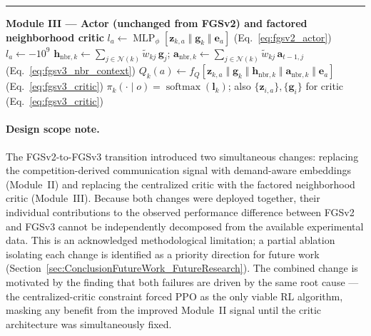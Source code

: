 \begin{algorithm}[ht]
\begin{algorithmic}[1]
    \EndFor
    \Statex \rule{\linewidth}{0.3pt}
    \Statex \textbf{Module III — Actor (unchanged from FGSv2) and factored neighborhood critic}
    \State $l_a \leftarrow \operatorname{MLP}_\phi[\mathbf{z}_{k,a}\;\Vert\;\mathbf{g}_k\;\Vert\;\mathbf{e}_a]$
    \hfill (Eq.~\ref{eq:fgsv2_actor})
    \Else
    \State $l_a \leftarrow -10^9$
    \EndIf
    \EndFor
    \State $\mathbf{h}_{\mathrm{nbr},k} \leftarrow \sum_{j \in \mathcal{N}(k)} \tilde{w}_{kj}\,\mathbf{g}_j$;
    \quad $\mathbf{a}_{\mathrm{nbr},k} \leftarrow \sum_{j \in \mathcal{N}(k)} \tilde{w}_{kj}\,\mathbf{a}_{t-1,j}$
    \hfill (Eq.~\ref{eq:fgsv3_nbr_context})
    \State $Q_k(a) \leftarrow f_Q[\mathbf{z}_{k,a}\;\Vert\;\mathbf{g}_k\;\Vert\;\mathbf{h}_{\mathrm{nbr},k}\;\Vert\;\mathbf{a}_{\mathrm{nbr},k}\;\Vert\;\mathbf{e}_a]$
    \hfill (Eq.~\ref{eq:fgsv3_critic})
    \EndFor
    \State \Return $\pi_k(\cdot\mid o) = \operatorname{softmax}(\mathbf{l}_k)$; also $\{\mathbf{z}_{i,a}\},\{\mathbf{g}_i\}$ for critic (Eq.~\ref{eq:fgsv3_critic})
  \end{algorithmic}
\end{algorithm}

\paragraph{Design scope note.}
The FGSv2-to-FGSv3 transition introduced two simultaneous changes: replacing the competition-derived communication signal with demand-aware embeddings (Module~II) and replacing the centralized critic with the factored neighborhood critic (Module~III). Because both changes were deployed together, their individual contributions to the observed performance difference between FGSv2 and FGSv3 cannot be independently decomposed from the available experimental data. This is an acknowledged methodological limitation; a partial ablation isolating each change is identified as a priority direction for future work (Section~\ref{sec:ConclusionFutureWork_FutureResearch}). The combined change is motivated by the finding that both failures are driven by the same root cause — the centralized-critic constraint forced PPO as the only viable RL algorithm, masking any benefit from the improved Module~II signal until the critic architecture was simultaneously fixed.
